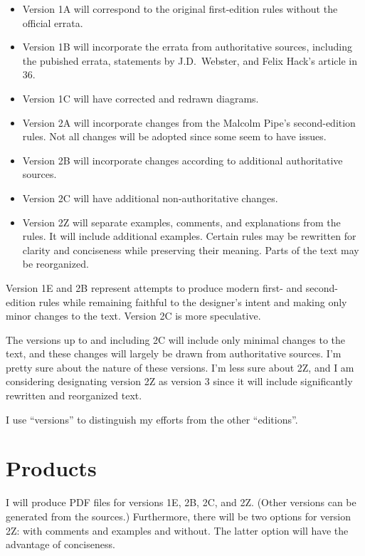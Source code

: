 \documentclass[10pt]{article}
\begin{document}
\begin{itemize}
    \item Version 1A will correspond to the original first-edition rules without the official errata.
    \item Version 1B will incorporate the errata from authoritative sources, including the pubished errata, statements by J.D.\ Webster, and Felix Hack’s article in {\APJ} 36.
    \item Version 1C will have corrected and redrawn diagrams.
    \item Version 2A will incorporate changes from the Malcolm Pipe’s second-edition rules. Not all changes will be adopted since some seem to have issues.
    \item Version 2B will incorporate changes according to additional authoritative sources.
    \item Version 2C will have additional non-authoritative changes.
    \item Version 2Z will separate examples, comments, and explanations from the rules. It will include additional examples. Certain rules may be rewritten for clarity and conciseness while preserving their meaning. Parts of the text may be reorganized.
\end{itemize}

Version 1E and 2B represent attempts to produce modern first- and second-edition rules while remaining faithful to the designer's intent and making only minor changes to the text. Version 2C is more speculative.

The versions up to and including 2C will include only minimal changes to the text, and these changes will largely be drawn from authoritative sources. I’m pretty sure about the nature of these versions. I’m less sure about 2Z, and I am considering designating version 2Z as version 3 since it will include significantly rewritten and reorganized text.

I use “versions” to distinguish my efforts from the other “editions”.

\section*{Products}

I will produce PDF files for versions 1E, 2B, 2C, and 2Z. (Other versions can be generated from the sources.) Furthermore, there will be two options for version 2Z: with comments and examples and without. The latter option will have the advantage of conciseness. 
\end{document}
